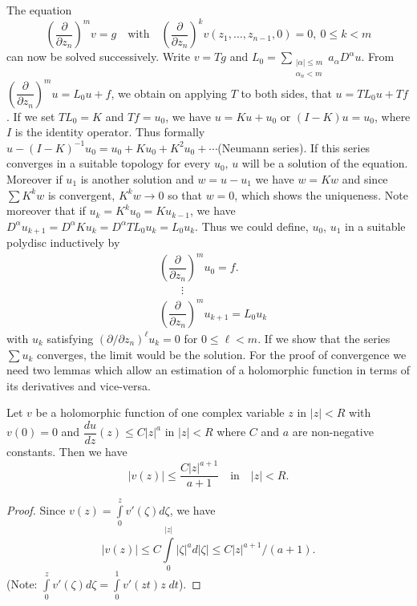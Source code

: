 The equation
$$
\left(\dfrac{\partial}{\partial z_{n}}\right)^{m}v=g\quad\text{with}\quad \left(\dfrac{\partial}{\partial z_{n}}\right)^{k}v(z_{1},\ldots,z_{n-1},0)=0, \ 0\leq k<m
$$
can now be solved successively. Write $v=Tg$ and $L_{0}=\sum\limits_{\substack{|\alpha|\leq m\\ \alpha_{n}<m}}a_{\alpha}D^{\alpha}u$. From $\left(\dfrac{\partial}{\partial z_{n}}\right)^{m}u=L_{0}u+f$, we obtain on applying $T$ to both sides, that $u=TL_{0}u+Tf$. If we set $TL_{0}=K$ and $Tf=u_{0}$, we have $u=Ku+u_{0}$ or $(I-K)u=u_{0}$, where $I$ is the identity operator. Thus formally $u-(I-K)^{-1}u_{0}=u_{0}+Ku_{0}+K^{2}u_{0}+\cdots$\pageoriginale (Neumann series). If this series converges in a suitable topology for every $u_{0}$, $u$ will be a solution of the equation. Moreover if $u_{1}$ is another solution and $w=u-u_{1}$ we have $w=Kw$ and since $\sum K^{k}w$ is convergent, $K^{k}w\to 0$ so that $w=0$, which shows the uniqueness. Note moreover that if $u_{k}=K^{k}u_{0}=Ku_{k-1}$, we have $D^{\alpha}u_{k+1}=D^{\alpha}Ku_{k}=D^{\alpha}TL_{0}u_{k}=L_{0}u_{k}$. Thus we could define, $u_{0}$, $u_{1}$ in a suitable polydisc inductively by
\begin{align*}
&\left(\dfrac{\partial}{\partial z_{n}}\right)^{m}u_{0}=f.\\[4pt]
&\qquad \vdots\\[4pt]
&\left(\dfrac{\partial}{\partial z_{n}}\right)^{m}u_{k+1}=L_{0}u_{k}
\end{align*}
with $u_{k}$ satisfying $(\partial /\partial z_{n})^{\ell}u_{k}=0$ for $0\leq \ell <m$. If we show that the series $\sum u_{k}$ converges, the limit would be the solution. For the proof of convergence we need two lemmas which allow an estimation of a holomorphic function in terms of its derivatives and vice-versa.

\setcounter{lemma}{0}
\begin{lemma}\label{appendix-lem1}
Let $v$ be a holomorphic function of one complex variable $z$ in $|z|<R$ with $v(0)=0$ and $\dfrac{du}{dz}(z)\leq C|z|^{a}$ in $|z|<R$ where $C$ and $a$ are non-negative constants. Then we have
$$
|v(z)|\leq \dfrac{C|z|^{a+1}}{a+1}\quad\text{in}\quad |z|<R.
$$
\end{lemma}

\begin{proof}
Since $v(z)=\int\limits^{z}_{0}v'(\zeta)d\zeta$, we have
$$
|v(z)|\leq C\int\limits^{|z|}_{0}|\zeta|^{a}d|\zeta|\leq C|z|^{a+1}/(a+1).
$$
(Note: $\int\limits^{z}_{0}v'(\zeta)d\zeta=\int\limits^{1}_{0}v'(zt)z\;dt$).
\end{proof}

